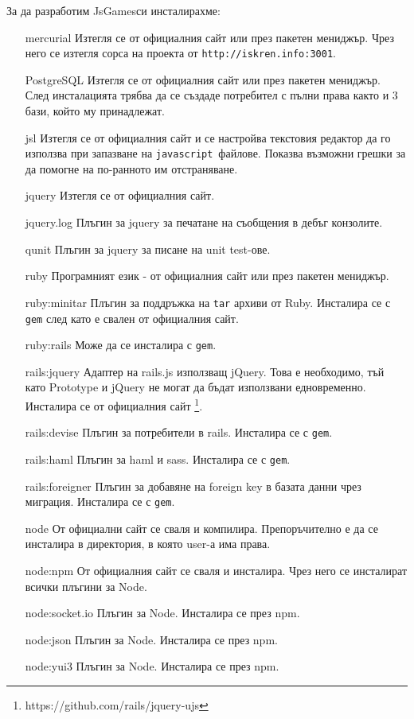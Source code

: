 \documentclass[a4paper]{article}
\def\js{\texttt{javascript}}
\def\jsg{JsGames}
\begin{document}
За да разработим \jsg си инсталирахме:
\begin{itemize}
  \item[mercurial] Изтегля се от официалния сайт или през пакетен мениджър. Чрез него се изтегля сорса на проекта от \texttt{http://iskren.info:3001}.
  \item[PostgreSQL] Изтегля се от официалния сайт или през пакетен мениджър. \\
    След инсталацията трябва да се създаде потребител с пълни права както и 3 бази, който му принадлежат.
  \item[jsl] Изтегля се от официалния сайт и се настройва текстовия редактор да го използва при запазване на \js\ файлове. Показва възможни грешки за да помогне на по-ранното им отстраняване.
  \item[jquery] Изтегля се от официалния сайт.
  \item[jquery.log] Плъгин за jquery за печатане на съобщения в дебъг конзолите.
  \item[qunit] Плъгин за jquery за писане на unit test-ове.
  \item[ruby] Програмният език - от официалния сайт или през пакетен мениджър.
  \item[ruby:minitar] Плъгин за поддръжка на \texttt{tar} архиви от Ruby. Инсталира се с \texttt{gem} след като е свален от официалния сайт.
  \item[ruby:rails] Може да се инсталира с \texttt{gem}.
  \item[rails:jquery] Адаптер на rails.js използващ jQuery. Това е необходимо, тъй като Prototype и jQuery не могат да бъдат използвани едновременно. Инсталира се от официалния сайт \footnote{https://github.com/rails/jquery-ujs}.
  \item[rails:devise] Плъгин за потребители в rails. Инсталира се с \texttt{gem}.
  \item[rails:haml] Плъгин за haml и sass. Инсталира се с \texttt{gem}.
  \item[rails:foreigner] Плъгин за добавяне на foreign key в базата данни чрез миграция. Инсталира се с \texttt{gem}.
  \item[node] От официални сайт се сваля и компилира. Препоръчително е да се инсталира в директория, в която user-а има права.
  \item[node:npm] От официалния сайт се сваля и инсталира. Чрез него се инсталират всички плъгини за Node.
  \item[node:socket.io] Плъгин за Node. Инсталира се през npm.
  \item[node:json] Плъгин за Node. Инсталира се през npm.
  \item[node:yui3] Плъгин за Node. Инсталира се през npm.
\end{itemize}
\end{document}
